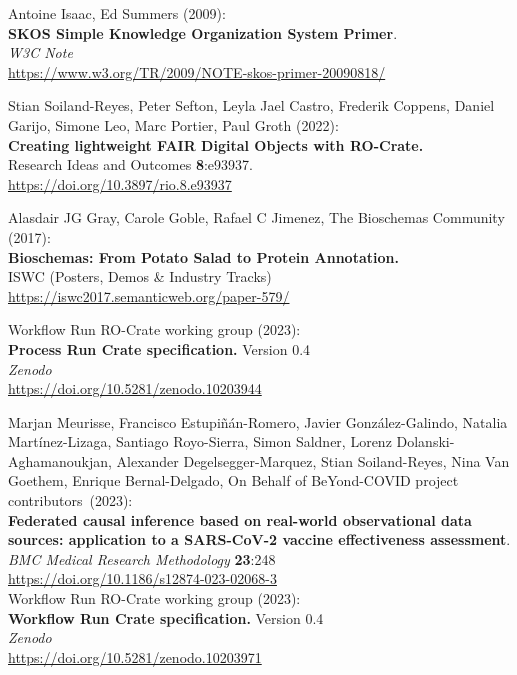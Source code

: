 \documentclass[10pt,letterpaper]{article}
\begin{document}
\begin{thebibliography}{10}
\begin{small}
Antoine Isaac, Ed Summers (2009):\\
\textbf{SKOS Simple Knowledge Organization System Primer}.\\
\emph{W3C Note}\\
\url{https://www.w3.org/TR/2009/NOTE-skos-primer-20090818/} 


 Stian Soiland-Reyes, Peter Sefton, Leyla Jael
Castro, Frederik Coppens, Daniel Garijo, Simone Leo, Marc Portier, Paul
Groth (2022):\\
\textbf{Creating lightweight FAIR Digital Objects with RO-Crate.}\\
Research Ideas and Outcomes \textbf{8}:e93937.\\
\url{https://doi.org/10.3897/rio.8.e93937}


Alasdair JG Gray, Carole Goble, Rafael C Jimenez, The
Bioschemas Community (2017):\\
\textbf{Bioschemas: From Potato Salad to Protein Annotation.}\\
ISWC (Posters, Demos \& Industry Tracks)\\
\url{https://iswc2017.semanticweb.org/paper-579/}

 Workflow Run RO-Crate working group (2023):\\
\textbf{Process Run Crate specification.} Version 0.4 \\
\emph{Zenodo} \\
\url{https://doi.org/10.5281/zenodo.10203944}

Marjan Meurisse, Francisco Estupiñán-Romero, Javier González-Galindo, Natalia Martínez-Lizaga, Santiago Royo-Sierra, Simon Saldner, Lorenz Dolanski-Aghamanoukjan, Alexander Degelsegger-Marquez, Stian Soiland-Reyes, Nina Van Goethem, Enrique Bernal-Delgado, On Behalf of BeYond-COVID project contributors~(2023): \\
\textbf{Federated causal inference based on real-world observational data sources: application to a SARS-CoV-2 vaccine effectiveness assessment}.  \\
\emph{BMC Medical Research Methodology} \textbf{23}:248\\
\url{https://doi.org/10.1186/s12874-023-02068-3}\\

 Workflow Run RO-Crate working group (2023):\\
\textbf{Workflow Run Crate specification.} Version 0.4\\
\emph{Zenodo} \\
\url{https://doi.org/10.5281/zenodo.10203971}



\end{small}
\end{thebibliography}
\end{document}
